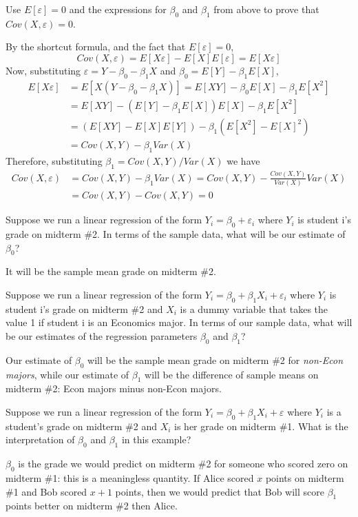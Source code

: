 \documentclass[addpoints,12pt]{exam}
\begin{document}
\begin{questions}
\question Use $E[\varepsilon] = 0$ and the expressions for $\beta_0$ and $\beta_1$ from above to prove that $Cov(X,\varepsilon) = 0$.
\begin{solution}
  By the shortcut formula, and the fact that $E[\varepsilon]=0$,
  \[
    Cov(X, \varepsilon) = E[X\varepsilon] - E[X]E[\varepsilon] = E[X\varepsilon]
  \]
  Now, substituting $\varepsilon = Y - \beta_0 - \beta_1 X$ and $\beta_0 = E[Y] - \beta_1 E[X]$, 
  \begin{align*}
    E[X\varepsilon] &= E[X(Y - \beta_0 - \beta_1 X)] = E[XY] - \beta_0 E[X] - \beta_1 E[X^2] \\
    &= E[XY] - \left(E[Y] - \beta_1 E[X]\right)E[X] - \beta_1 E[X^2]\\
    &= \left( E[XY] - E[X]E[Y] \right) - \beta_1 \left( E[X^2] - E[X]^2 \right)\\
    &= Cov(X,Y) - \beta_1 Var(X)
  \end{align*}
  Therefore, substituting $\beta_1 = Cov(X,Y)/Var(X)$ we have
  \begin{align*}
    Cov(X,\varepsilon) &= Cov(X,Y) - \beta_1 Var(X) = Cov(X,Y) - \frac{Cov(X,Y)}{Var(X)} Var(X)\\
    &= Cov(X,Y) - Cov(X,Y) = 0
  \end{align*}
\end{solution}


\question Suppose we run a linear regression of the form $Y_i = \beta_0 + \varepsilon_i$ where $Y_i$ is student i's grade on midterm \#2. In terms of the sample data, what will be our estimate of $\beta_0$?
\begin{solution}
  It will be the sample mean grade on midterm \#2.
\end{solution}

\question Suppose we run a linear regression of the form $Y_i = \beta_0 + \beta_1 X_i + \varepsilon_i$ where $Y_i$ is student i's grade on midterm \#2 and $X_i$ is a dummy variable that takes the value 1 if student i is an Economics major. In terms of our sample data, what will be our estimates of the regression parameters $\beta_0$ and $\beta_1$?
\begin{solution}
  Our estimate of $\beta_0$ will be the sample mean grade on midterm \#2 for \emph{non-Econ majors}, while our estimate of $\beta_1$ will be the difference of sample means on midterm \#2: Econ majors minus non-Econ majors.
\end{solution}

\question Suppose we run a linear regression of the form $Y_i = \beta_0 + \beta_1 X_i + \varepsilon$ where $Y_i$ is a student's grade on midterm \#2 and $X_i$ is her grade on midterm \#1.
What is the interpretation of $\beta_0$ and $\beta_1$ in this example?
\begin{solution}
  $\beta_0$ is the grade we would predict on midterm \#2 for someone who scored zero on midterm \#1: this is a meaningless quantity.
  If Alice scored $x$ points on midterm \#1 and Bob scored $x+1$ points, then we would predict that Bob will score $\beta_1$ points better on midterm \#2 then Alice.
\end{solution}


\end{questions}
\end{document}
